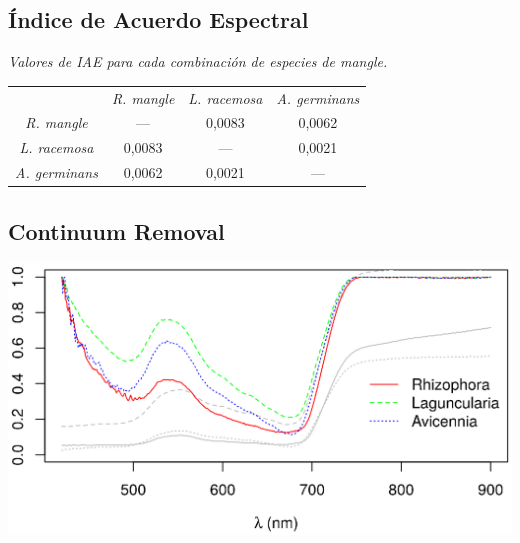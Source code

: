 \documentclass[12pt]{beamer}
\begin{document}
\subsection{Índice de Acuerdo Espectral}
\begin{frame}
	\begin{table}
		\centering
\textit{{\footnotesize Valores de IAE para cada combinación de especies de mangle.}}\\
		\begin{tabular}{@{}cccc@{}}
			\toprule[0.4mm]
			& \textit{R. mangle} & \textit{L. racemosa} & \textit{A. germinans} \\
			\textit{R. mangle} & --- & 0,0083 & 0,0062 \\
			\textit{L. racemosa} & 0,0083 & --- & 0,0021 \\
			\textit{A. germinans} & 0,0062 & 0,0021 & --- \\
			\bottomrule[0.4mm]
		\end{tabular}
	\end{table}
\end{frame}

\subsection{Continuum Removal}
\begin{frame}
	\includegraphics[width=\linewidth]{./Graficos/ContinuumR2.eps}
\end{frame}
\end{document}
